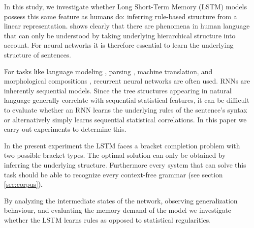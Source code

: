 \documentclass[11pt,a4paper]{article}
\begin{document}
In this study, we investigate whether Long Short-Term Memory (LSTM) models \cite{hochreiter1997long} possess this same feature as humans do: inferring rule-based structure from a linear representation. \citeauthor{everaert2015structures}  shows clearly that there are phenomena in human language that can only be understood by taking underlying hierarchical structure into account. For neural networks it is therefore essential to learn the underlying structure of sentences.

For tasks like language modeling \cite{mikolov2010recurrent, sundermeyer2012lstm}, parsing \cite{vinyals2015grammar, kiperwasser2016simple, dyer2016recurrent}, machine translation, \cite{bahdanau2014neural} and morphological compositions \cite{kim2016character}, recurrent neural networks are often used. RNNs are inherently sequential models. Since the tree structures appearing in natural language generally correlate with sequential statistical features, it can be difficult to evaluate whether an RNN learns the underlying rules of the sentence's syntax or alternatively simply learns sequential statistical correlations.  In this paper we carry out experiments to determine this.

In the present experiment the LSTM faces a bracket completion problem with two possible bracket types. The optimal solution can only be obtained by inferring the underlying structure. Furthermore every system that can solve this task should be able to recognize every context-free grammar (see section \ref{sec:corpus}).

By analyzing the intermediate states of the network, observing generalization behaviour, and evaluating the memory demand of the model we investigate whether the LSTM learns rules as opposed to statistical regularities.
\end{document}

